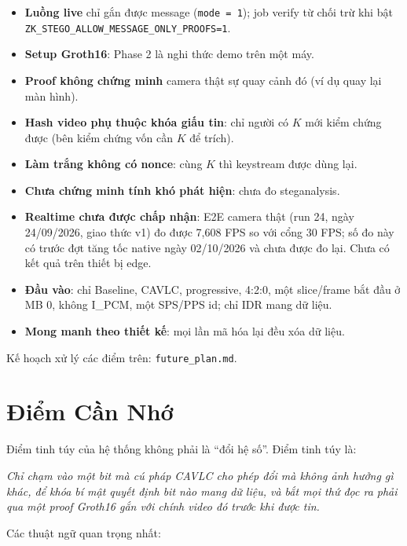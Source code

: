 \documentclass[11pt,a4paper]{article}
\begin{document}
\begin{itemize}[leftmargin=*]
  \item \textbf{Luồng live} chỉ gắn được message (\texttt{mode = 1}); job verify từ chối
  trừ khi bật \texttt{ZK\_STEGO\_ALLOW\_MESSAGE\_ONLY\_PROOFS=1}.
  \item \textbf{Setup Groth16}: Phase 2 là nghi thức demo trên một máy.
  \item \textbf{Proof không chứng minh} camera thật sự quay cảnh đó (ví dụ quay lại
  màn hình).
  \item \textbf{Hash video phụ thuộc khóa giấu tin}: chỉ người có \(K\) mới kiểm chứng
  được (bên kiểm chứng vốn cần \(K\) để trích).
  \item \textbf{Làm trắng không có nonce}: cùng \(K\) thì keystream được dùng lại.
  \item \textbf{Chưa chứng minh tính khó phát hiện}: chưa đo steganalysis.
  \item \textbf{Realtime chưa được chấp nhận}: E2E camera thật (run 24, ngày
  24/09/2026, giao thức v1) đo được 7{,}608 FPS so với cổng 30 FPS; số đo này có trước
  đợt tăng tốc native ngày 02/10/2026 và chưa được đo lại. Chưa có kết quả trên thiết
  bị edge.
  \item \textbf{Đầu vào}: chỉ Baseline, CAVLC, progressive, 4:2:0, một slice/frame bắt
  đầu ở MB 0, không I\_PCM, một SPS/PPS id; chỉ IDR mang dữ liệu.
  \item \textbf{Mong manh theo thiết kế}: mọi lần mã hóa lại đều xóa dữ liệu.
\end{itemize}

Kế hoạch xử lý các điểm trên: \texttt{future\_plan.md}.

\section{Điểm Cần Nhớ}

Điểm tinh túy của hệ thống không phải là ``đổi hệ số''. Điểm tinh túy là:

\begin{center}
\textit{Chỉ chạm vào một bit mà cú pháp CAVLC cho phép đổi mà không ảnh hưởng gì
khác, để khóa bí mật quyết định bit nào mang dữ liệu, và bắt mọi thứ đọc ra phải
qua một proof Groth16 gắn với chính video đó trước khi được tin.}
\end{center}

Các thuật ngữ quan trọng nhất:
\end{document}

